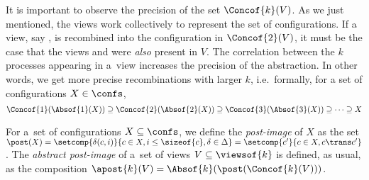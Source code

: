 %
%
It is important to observe the precision of the set
$\Concof{k}(V)$. As we just mentioned, the views work collectively to
represent the set of configurations. If a view, say , is
recombined into the configuration  in $\Concof{2}(V)$, it
must be the case that the views  and  were \emph{also}
present in $V$.
%
%
The correlation between the $k$ processes appearing in a~view
increases the precision of the abstraction. In other words, we get
more precise recombinations with larger $k$, i.e.\ formally, for a set
of configurations $X\in\confs$,
$$
\Concof{1}(\Absof{1}(X))\supseteq 
\Concof{2}(\Absof{2}(X))\supseteq
\Concof{3}(\Absof{3}(X))\supseteq
\cdots\supseteq X$$

%
%
For a~set of configurations $X\subseteq\confs$, we define the
\emph{post-image} of $X$ as the set %
$\post(X) = \setcomp{\delta(c,i)}{c\in X,
  i\leq\sizeof{c},\delta\in\Delta} = \setcomp{c'}{c\in X, c\trans
  c'}$.
%
%
%
The \emph{abstract post-image} of a~set of views
$V\subseteq\viewsof{k}$ is defined, as usual, as the composition
$\apost{k}(V) = \Absof{k}(\post(\Concof{k}(V)))$.



